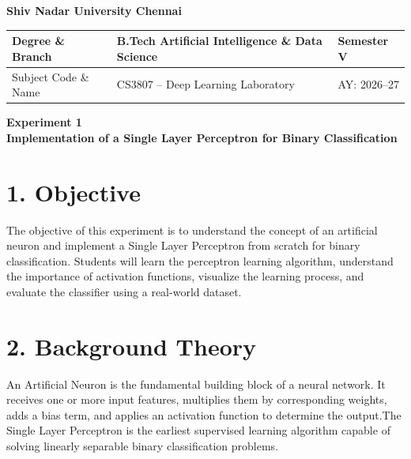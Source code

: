 \documentclass[11pt]{article}
\begin{document}
\begin{center}
\Large\textbf{Shiv Nadar University Chennai}\\[2mm]
\end{center}

\renewcommand{\arraystretch}{1.4}

\begin{tabular}{|p{3.5cm}|p{8cm}|p{2cm}|}
\hline
Degree \& Branch & B.Tech Artificial Intelligence \& Data Science & Semester V\\ \hline
Subject Code \& Name & CS3807 -- Deep Learning Laboratory & AY: 2026--27\\ \hline
\end{tabular}

\vspace{3mm}

\begin{center}
\Large\textbf{Experiment 1}\\
\large\textbf{Implementation of a Single Layer Perceptron for Binary Classification}
\end{center}


\section*{1. Objective}

The objective of this experiment is to understand the concept of an artificial neuron and implement a Single Layer Perceptron from scratch for binary classification. Students will learn the perceptron learning algorithm, understand the importance of activation functions, visualize the learning process, and evaluate the classifier using a real-world dataset.



\section*{2. Background Theory}

An Artificial Neuron is the fundamental building block of a neural network. It receives one or more input features, multiplies them by corresponding weights, adds a bias term, and applies an activation function to determine the output.The Single Layer Perceptron is the earliest supervised learning algorithm capable of solving linearly separable binary classification problems.
\end{document}
